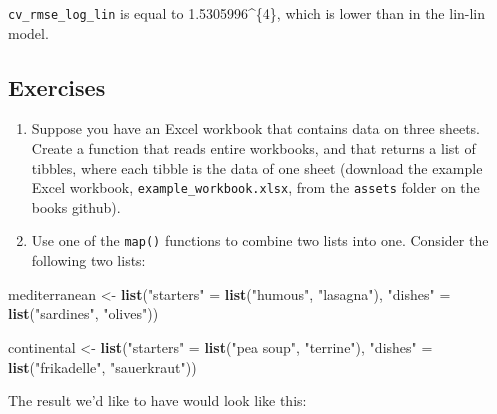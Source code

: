 \documentclass[]{gitbook}
\newenvironment{Shaded}{\begin{snugshade}}{\end{snugshade}}
\newcommand{\KeywordTok}[1]{\textcolor[rgb]{0.13,0.29,0.53}{\textbf{#1}}}
\newcommand{\NormalTok}[1]{#1}
\newcommand{\StringTok}[1]{\textcolor[rgb]{0.31,0.60,0.02}{#1}}
\theoremstyle{definition}
\theoremstyle{definition}
\theoremstyle{definition}
\theoremstyle{remark}
\begin{document}
\texttt{cv\_rmse\_log\_lin} is equal to 1.5305996\^{}\{4\},
which is lower than in the lin-lin model.

\hypertarget{exercises-6}{%
\subsection{Exercises}\label{exercises-6}}

\begin{enumerate}
\def\labelenumi{\arabic{enumi}.}
\item
  Suppose you have an Excel workbook that contains data on three sheets.
  Create a function that reads entire workbooks, and that returns a list
  of tibbles, where each tibble is the data of one sheet (download the
  example Excel workbook, \texttt{example\_workbook.xlsx}, from the
  \texttt{assets} folder on the books github).
\item
  Use one of the \texttt{map()} functions to combine two lists into one.
  Consider the following two lists:
\end{enumerate}

\begin{Shaded}
\begin{Highlighting}[]
\NormalTok{mediterranean <-}\StringTok{ }\KeywordTok{list}\NormalTok{(}\StringTok{"starters"}\NormalTok{ =}\StringTok{ }\KeywordTok{list}\NormalTok{(}\StringTok{"humous"}\NormalTok{, }\StringTok{"lasagna"}\NormalTok{), }\StringTok{"dishes"}\NormalTok{ =}\StringTok{ }\KeywordTok{list}\NormalTok{(}\StringTok{"sardines"}\NormalTok{, }\StringTok{"olives"}\NormalTok{))}

\NormalTok{continental <-}\StringTok{ }\KeywordTok{list}\NormalTok{(}\StringTok{"starters"}\NormalTok{ =}\StringTok{ }\KeywordTok{list}\NormalTok{(}\StringTok{"pea soup"}\NormalTok{, }\StringTok{"terrine"}\NormalTok{), }\StringTok{"dishes"}\NormalTok{ =}\StringTok{ }\KeywordTok{list}\NormalTok{(}\StringTok{"frikadelle"}\NormalTok{, }\StringTok{"sauerkraut"}\NormalTok{))}
\end{Highlighting}
\end{Shaded}

The result we'd like to have would look like this:
\end{document}
